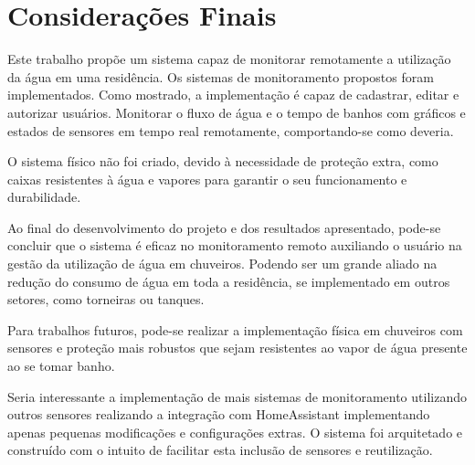 \chapter{Considerações Finais}

Este trabalho propõe um sistema capaz de monitorar remotamente a utilização da água em uma residência. Os sistemas de monitoramento propostos foram implementados. Como mostrado, a implementação é capaz de cadastrar, editar e autorizar usuários. Monitorar o fluxo de água e o tempo de banhos com gráficos e estados de sensores em tempo real remotamente, comportando-se como deveria.

O sistema físico não foi criado, devido à necessidade de proteção extra, como caixas resistentes à água e vapores para garantir o seu funcionamento e durabilidade.

Ao final do desenvolvimento do projeto e dos resultados apresentado, pode-se concluir que o sistema é eficaz no monitoramento remoto auxiliando o usuário na gestão da utilização de água em chuveiros. Podendo ser um grande aliado na redução do consumo de água em toda a residência, se implementado em outros setores, como torneiras ou tanques.

Para trabalhos futuros, pode-se realizar a implementação física em chuveiros com sensores e proteção mais robustos que sejam resistentes ao vapor de água presente ao se tomar banho. 

Seria interessante a implementação de mais sistemas de monitoramento utilizando outros sensores realizando a integração com HomeAssistant implementando apenas pequenas modificações e configurações extras. O sistema foi arquitetado e construído com o intuito de facilitar esta inclusão de sensores e reutilização.